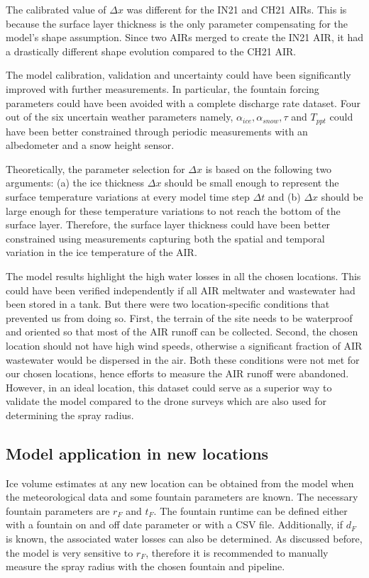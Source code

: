 \documentclass[utf8]{frontiersSCNS}
\begin{document}
The calibrated value of $\Delta x$ was different for the IN21 and CH21 AIRs. This is because the surface layer
thickness is the only parameter compensating for the model's shape assumption. Since two AIRs merged to create
the IN21 AIR, it had a drastically different shape evolution compared to the CH21 AIR. 

The model calibration, validation and uncertainty could have been significantly improved with further
measurements. In particular, the fountain forcing parameters could have been avoided with a complete discharge
rate dataset. Four out of the six uncertain weather parameters namely, $\alpha_{ice}, \alpha_{snow}, \tau$ and
$T_{ppt}$ could have been better constrained through periodic measurements with an albedometer and a snow height
sensor. 

Theoretically, the parameter selection for $\Delta x$ is based on the following two arguments: (a) the ice
thickness $\Delta x$ should be small enough to represent the surface temperature variations at every model time
step $\Delta t$ and (b) $\Delta x$ should be large enough for these temperature variations to not reach the
bottom of the surface layer. Therefore, the surface layer thickness could have been better constrained using
measurements capturing both the spatial and temporal variation in the ice temperature of the AIR.

The model results highlight the high water losses in all the chosen locations. This could have been verified
independently if all AIR meltwater and wastewater had been stored in a tank. But there were two
location-specific conditions that prevented us from doing so. First, the terrain of the site needs to be
waterproof and oriented so that most of the AIR runoff can be collected. Second, the chosen location should not
have high wind speeds, otherwise a significant fraction of AIR wastewater would be dispersed in the air. Both
these conditions were not met for our chosen locations, hence efforts to measure the AIR runoff were abandoned.
However, in an ideal location, this dataset could serve as a superior way to validate the model compared to the
drone surveys which are also used for determining the spray radius.

\subsection{Model application in new locations}

Ice volume estimates at any new location can be obtained from the model when the meteorological data and some
fountain parameters are known. The necessary fountain parameters are $r_F$ and $t_F$. The fountain runtime can
be defined either with a fountain on and off date parameter or with a CSV file. Additionally, if $d_F$ is known,
the associated water losses can also be determined. As discussed before, the model is very sensitive to $r_F$,
therefore it is recommended to manually measure the spray radius with the chosen fountain and pipeline. 
\end{document}
